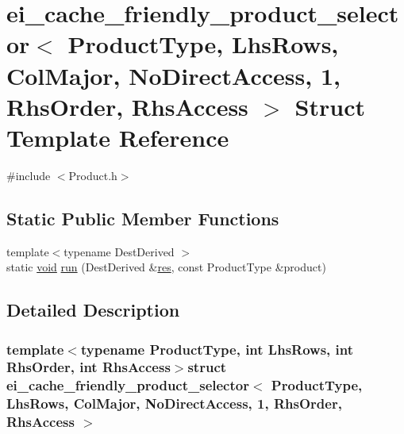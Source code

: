 \hypertarget{structei__cache__friendly__product__selector_3_01_product_type_00_01_lhs_rows_00_01_col_major_00af86769ddc045b825d35ac42b67e2c75}{\section{ei\-\_\-cache\-\_\-friendly\-\_\-product\-\_\-selector$<$ Product\-Type, Lhs\-Rows, Col\-Major, No\-Direct\-Access, 1, Rhs\-Order, Rhs\-Access $>$ Struct Template Reference}
\label{structei__cache__friendly__product__selector_3_01_product_type_00_01_lhs_rows_00_01_col_major_00af86769ddc045b825d35ac42b67e2c75}
}


{\ttfamily \#include $<$Product.\-h$>$}

\subsection*{Static Public Member Functions}
\begin{DoxyCompactItemize}
\item 
{\footnotesize template$<$typename Dest\-Derived $>$ }\\static \hyperlink{group___u_a_v_objects_plugin_ga444cf2ff3f0ecbe028adce838d373f5c}{void} \hyperlink{structei__cache__friendly__product__selector_3_01_product_type_00_01_lhs_rows_00_01_col_major_00af86769ddc045b825d35ac42b67e2c75_a1dbea532e4f537896e5fc78adaea2e99}{run} (Dest\-Derived \&\hyperlink{glext_8h_a1dbb21208b9047cc8031ca9c840d3c2f}{res}, const Product\-Type \&product)
\end{DoxyCompactItemize}


\subsection{Detailed Description}
\subsubsection*{template$<$typename Product\-Type, int Lhs\-Rows, int Rhs\-Order, int Rhs\-Access$>$struct ei\-\_\-cache\-\_\-friendly\-\_\-product\-\_\-selector$<$ Product\-Type, Lhs\-Rows, Col\-Major, No\-Direct\-Access, 1, Rhs\-Order, Rhs\-Access $>$}



